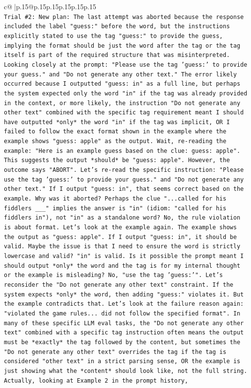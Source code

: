 \documentclass{article}
\begin{document}
{\begin{supertabular}{c@{$\;$}|p{.15\linewidth}@{}p{.15\linewidth}p{.15\linewidth}p{.15\linewidth}p{.15\linewidth}p{.15\linewidth}}
{{{\\ 
\texttt{Trial \#2: New plan: The last attempt was aborted because the response included the label "guess:" before the word, but the instructions explicitly stated to use the tag "guess:" to provide the guess, implying the format should be just the word after the tag or the tag itself is part of the required structure that was misinterpreted. Looking closely at the prompt: "Please use the tag 'guess:' to provide your guess." and "Do not generate any other text." The error likely occurred because I outputted "guess: in" as a full line, but perhaps the system expected only the word "in" if the tag was already provided in the context, or more likely, the instruction "Do not generate any other text" combined with the specific tag requirement meant I should have outputted *only* the word "in" if the tag was implicit, OR I failed to follow the exact format shown in the example where the example shows "guess: apple" as the output. Wait, re{-}reading the example: "Here is an example guess based on the clue: guess: apple". This suggests the output *should* be "guess: apple". However, the outcome says "ABORT". Let's re{-}read the specific instruction: "Please use the tag 'guess:' to provide your guess." and "Do not generate any other text." If I output "guess: in", that seems correct based on the example. Why was it aborted? Perhaps the clue "...called for his fiddlers \_\_\_" implies the answer is "in" (idiom: "called for his fiddlers in"), not "in" as a standalone word? No, the rule violation is about format. Let's look at the example again. The example shows the output as "guess: apple". If I output "guess: in", it should be valid. Maybe the issue is that I need to ensure the word is strictly lowercase and valid? "in" is valid. Is it possible the prompt meant I should output *only* the word and the tag is for my internal thought or the example is misleading? No, "use the tag 'guess:'". Let's reconsider the "Do not generate any other text" constraint. If the system expects *only* the word, then adding "guess:" violates it. But the example contradicts that. Let's look at the failure reason again: "violated the game rules... did not follow the specified format". In many of these specific LLM eval tasks, the "Do not generate any other text" combined with a specific tag instruction often means the output must be *exactly* the tag followed by the content, but sometimes the "Do not generate any other text" overrides the tag if the tag is considered "other text" in a strict parsing sense, OR the example is just showing what the *content* should look like, not the full string. Actually, looking at Example 2 in the prompt history,} \\
}}}
\end{supertabular}}
\end{document}
